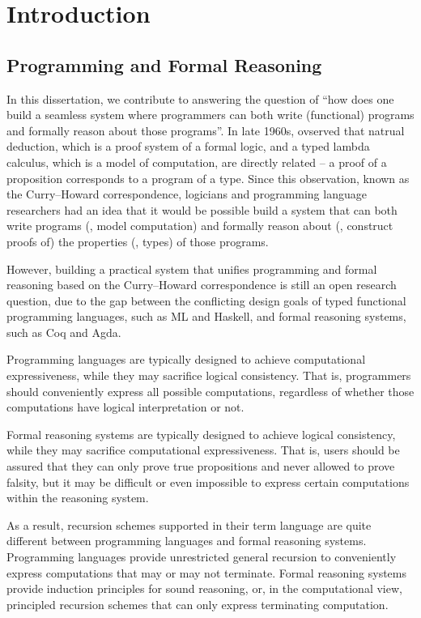 \chapter{Introduction}\label{ch:intro}

\section{Programming and Formal Reasoning}\label{sec:intro:motiv}
In this dissertation, we contribute to answering the question of
``how does one build a seamless system where programmers can both
write (functional) programs and formally reason about those programs''.
In late 1960s, \citet{Howard69} ovserved that natrual deduction, which is
a proof system of a formal logic, and a typed lambda calculus, which is
a model of computation, are directly related --
a proof of a proposition corresponds to a program of a type.
Since this observation, known as the Curry--Howard correspondence,
logicians and programming language researchers had an idea that
it would be possible build a system that can both write programs
(\ie, model computation) and formally reason about (\ie, construct proofs of)
the properties (\ie, types) of those programs.

However, building a practical system that unifies programming and
formal reasoning based on the Curry--Howard correspondence is still
an open research question, due to the gap between the conflicting
design goals of typed functional programming languages, such as ML and Haskell,
and formal reasoning systems, such as Coq and Agda.

Programming languages are typically designed to achieve
computational expressiveness, while they may sacrifice logical consistency.
That is, programmers should
conveniently express all possible computations, regardless of whether those
computations have logical interpretation or not.

Formal reasoning systems are typically designed to achieve logical consistency,
while they may sacrifice computational expressiveness. That is, users
should be assured that they can only prove true propositions and never
allowed to prove falsity, but it may be difficult or even impossible to
express certain computations within the reasoning system.

As a result, recursion schemes supported in their term language
are quite different between programming languages and formal reasoning systems.
Programming languages provide unrestricted general recursion
to conveniently express computations
that may or may not terminate.
Formal reasoning systems provide induction principles for sound reasoning,
or, in the computational view, principled recursion schemes
that can only express terminating computation.

